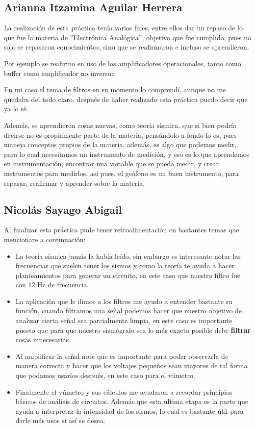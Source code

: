 \documentclass[12pt]{article}
\begin{document}
	    \subsection{Arianna Itzamina Aguilar Herrera}
	    La realización de esta práctica tenía varios fines, entre ellos dar un repaso de lo que fue la materia de ''Electrónica Analógica'', objetivo que fue cumplido, pues no solo se repasaron conocimientos, sino que se reafirmaron e incluso se aprendieron.
	    
	    Por ejemplo se reafirmo en uso de los amplificadores operacionales, tanto como buffer como amplificador no inversor.
	    
	    En mi caso el tema de filtros en su momento lo comprendí, aunque no me quedaba del todo claro, después de haber realizado esta práctica puedo decir que ya lo sé. 
	    
	    Además, se aprendieron cosas nuevas, como teoría sísmica, que si bien podría decirse no es propiamente parte de la materia, pensándolo a fondo lo es, pues maneja conceptos propios de la materia, además, es algo que podemos medir, para lo cual necesitamos un instrumento de medición, y eso es lo que aprendemos en instrumentación, encontrar una variable que se pueda medir, y crear instrumentos para medirlos, así pues, el geófono es un buen instrumento, para repasar, reafirmar y aprender sobre la materia. 
	    \subsection{Nicolás Sayago Abigail}
	    Al finalizar esta práctica pude tener retroalimentación en bastantes temas que mencionare a continuación:
	    \begin{itemize}
	        \item[\checkmark] La teoría sísmica jamás la había leído, sin embargo es interesante notar las frecuencias que suelen tener los sismos y como la teoría te ayuda a hacer planteamientos para generar un circuito, en este caso que nuestro filtro fue con 12 Hz de frecuencia.
	        
	        \item[\checkmark] La aplicación que le dimos a los filtros me ayudo a entender bastante su función, cuando filtramos una señal podemos hacer que nuestro objetivo de analizar cierta señal sea parcialmente limpia, en este caso es importante puesto que para que nuestro sismógrafo sea lo más exacto posible debe \textbf{filtrar} cosas innecesarias.
	        
	        \item[\checkmark] Al amplificar la señal note que es importante para poder observarla de manera correcta y hacer que los voltajes pequeños sean mayores de tal forma que podamos usarlos después, en este caso para el vúmetro.
	        
	        \item[\checkmark] Finalmente el vúmetro y sus cálculos me ayudaron a recordar principios básicos de análisis de circuitos. Además que esta ultima etapa es la parte que ayuda a interpretar la intensidad de los sismos, lo cual es bastante útil para darle más usos si así se desea.
	    \end{itemize}
	    
\end{document}
